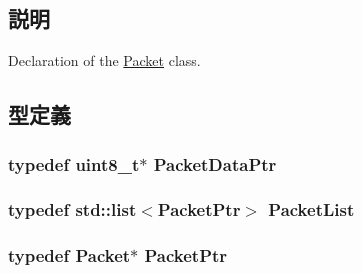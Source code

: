 \subsection{説明}
Declaration of the \hyperlink{classPacket}{Packet} class. 

\subsection{型定義}
\hypertarget{packet_8hh_ae85a9de970f801a77a1ad88ee2b39ea2}{
\subsubsection[{PacketDataPtr}]{\setlength{\rightskip}{0pt plus 5cm}typedef uint8\_\-t$\ast$ {\bf PacketDataPtr}}}
\label{packet_8hh_ae85a9de970f801a77a1ad88ee2b39ea2}
\hypertarget{packet_8hh_afda380bd563a3c5bf91ed82b01b1bd0a}{
\subsubsection[{PacketList}]{\setlength{\rightskip}{0pt plus 5cm}typedef {\bf std::list}$<${\bf PacketPtr}$>$ {\bf PacketList}}}
\label{packet_8hh_afda380bd563a3c5bf91ed82b01b1bd0a}
\hypertarget{packet_8hh_a470982fd720cbb1a92fc936965738abc}{
\subsubsection[{PacketPtr}]{\setlength{\rightskip}{0pt plus 5cm}typedef {\bf Packet}$\ast$ {\bf PacketPtr}}}
\label{packet_8hh_a470982fd720cbb1a92fc936965738abc}
